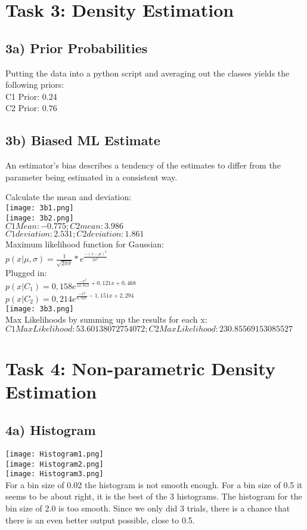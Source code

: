 \documentclass{article}
\begin{document}
\section{Task 3: Density Estimation}
\subsection{3a) Prior Probabilities}
Putting the data into a python script and averaging out the classes yields the following priors: \\
C1 Prior: $0.24$ \\
C2 Prior: $0.76$

\subsection{3b) Biased ML Estimate}
An estimator's bias describes a tendency of the estimates to differ from the parameter being estimated in a consistent way.

Calculate the mean and deviation:\\
\texttt{[image: 3b1.png]}\\
\texttt{[image: 3b2.png]}\\
$C1 Mean: -0.775 ; C2 mean: 3.986$\\
$C1 deviation: 2.531 ; C2 deviation: 1.861$\\
Maximum likelihood function for Gaussian:\\
$p(x|\mu, \sigma) = \frac{1}{\sqrt{2\pi\sigma}} * e^{\frac{-(x-\mu)^2}{2\sigma^2}}$\\
Plugged in:\\
$p(x| C_1) = 0,158 e^{\frac{-x^2}{12,812} + 0,121x + 0,468}$\\
$p(x| C_2) = 0,214 e^{\frac{-x^2}{6,927} - 1,151x + 2,294}$\\
\texttt{[image: 3b3.png]}\\
Max Likelihoods by summing up the results for each x:\\
$C1 MaxLikelihood: 53.60138072754072 ; C2 MaxLikelihood: 230.85569153085527$

\section{Task 4: Non-parametric Density Estimation}
\subsection{4a) Histogram}

\texttt{[image: Histogram1.png]}\\
\texttt{[image: Histogram2.png]}\\
\texttt{[image: Histogram3.png]}\\
For a bin size of 0.02 the histogram is not smooth enough. For a bin size of 0.5 it seems to be about right, it is the best of the 3 histograms. The histogram for the bin size of 2.0 is too smooth. Since we only did 3 trials, there is a chance that there is an even better output possible, close to 0.5.
\end{document}

